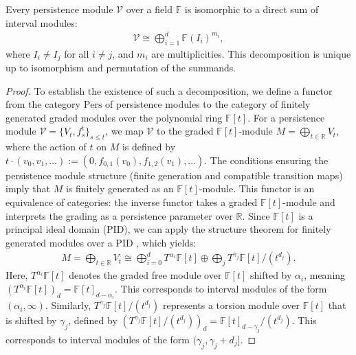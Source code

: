 \begin{theorem}[Decomposition]{\cite[\S 1.5]{chazal2016structure}}
\label{decompositionPersistenceModules}
Every persistence module $\mathcal{V}$ over a field $\mathbb{F}$ is isomorphic to a direct sum of interval modules:
\begin{align}
	\mathcal{V} \cong \bigoplus_{i=1}^{d} \mathbb{F}(I_i)^{m_i},
\end{align}
where $I_i \neq I_j$ for all $i \neq j$, and $m_i$ are multiplicities. This decomposition is unique up to isomorphism and permutation of the summands.
\end{theorem}

\begin{proof}
To establish the existence of such a decomposition, we define a functor from the category $\mathrm{Pers}$ of persistence modules to the category of finitely generated graded modules over the polynomial ring $\mathbb{F}[t]$. For a persistence module $\mathcal{V} = \{V_t, f_{s}^t\}_{s \leq t}$, we map $\mathcal{V}$ to the graded $\mathbb{F}[t]$-module $M = \bigoplus_{t \in \mathbb{R}} V_t$, where the action of $t$ on $M$ is defined by $t \cdot (v_0, v_1, \ldots) := (0, f_{0,1}(v_0), f_{1,2}(v_1), \ldots)$. The conditions ensuring the persistence module structure (finite generation and compatible transition maps) imply that $M$ is finitely generated as an $\mathbb{F}[t]$-module. This functor is an equivalence of categories: the inverse functor takes a graded $\mathbb{F}[t]$-module and interprets the grading as a persistence parameter over $\mathbb{R}$. Since $\mathbb{F}[t]$ is a principal ideal domain (PID), we can apply the structure theorem for finitely generated modules over a PID \cite[\S 2.1]{zomorodian2004computing}, which yields:
\begin{align}
	M = \bigoplus_{t \in \mathbb{R}} V_t \cong \bigoplus_{i=0}^d T^{\alpha_i} \mathbb{F}[t] \oplus \bigoplus_j T^{\gamma_j} \mathbb{F}[t] / (t^{d_j}).
\end{align}
Here, \( T^{\alpha_i} \mathbb{F}[t] \) denotes the graded free module over \( \mathbb{F}[t] \) shifted by \( \alpha_i \), meaning \( (T^{\alpha_i} \mathbb{F}[t])_d = \mathbb{F}[t]_{d - \alpha_i} \). This corresponds to interval modules of the form \( (\alpha_i, \infty) \). Similarly, \( T^{\gamma_j} \mathbb{F}[t] / (t^{d_j}) \) represents a torsion module over \( \mathbb{F}[t] \) that is shifted by \( \gamma_j \), defined by \( (T^{\gamma_j} \mathbb{F}[t] / (t^{d_j}))_d = \mathbb{F}[t]_{d - \gamma_j} / (t^{d_j}) \). This corresponds to interval modules of the form \( (\gamma_j, \gamma_j + d_j] \). 


\end{proof}
